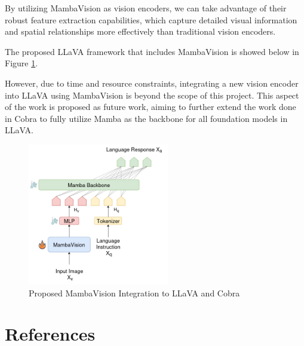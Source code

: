 \documentclass[12pt, conference, compsoc, onecolumn]{IEEEtran}
\begin{document}
	By utilizing MambaVision as vision encoders, we can take advantage of their robust feature extraction capabilities, which capture detailed visual information and spatial relationships more effectively than traditional vision encoders. 
	
	The proposed LLaVA framework that includes MambaVision is showed below in Figure \ref{fig:llava_update}.
	
	However, due to time and resource constraints, integrating a new vision encoder into LLaVA using MambaVision is beyond the scope of this project. This aspect of the work is proposed as future work, aiming to further extend the work done in Cobra to fully utilize Mamba as the backbone for all foundation models in LLaVA.
	
	\begin{figure}[H]
		\centering
		\includegraphics[width=0.55\textwidth]{figures/llava_update.png}
		\caption{Proposed MambaVision Integration to LLaVA and Cobra}
		\label{fig:llava_update}
	\end{figure}
	
	
	\section*{References}
	\printbibliography[heading=none]
	
	
	
\end{document}
